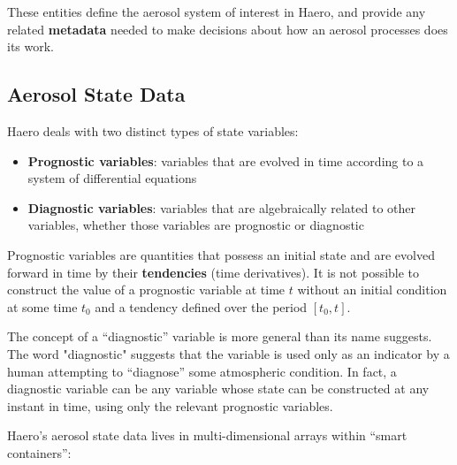 These entities define the aerosol system of interest in Haero, and provide
any related {\bf metadata} needed to make decisions about how an aerosol
processes does its work.

\subsection{Aerosol State Data}

Haero deals with two distinct types of state variables:

\begin{itemize}
  \item {\bf Prognostic variables}: variables that are evolved in time according
        to a system of differential equations
  \item {\bf Diagnostic variables}: variables that are algebraically related to
        other variables, whether those variables are prognostic or diagnostic
\end{itemize}

Prognostic variables are quantities that possess an initial state and are
evolved forward in time by their {\bf tendencies} (time derivatives). It is
not possible to construct the value of a prognostic variable at time $t$ without
an initial condition at some time $t_0$ and a tendency defined over the period
$\left[t_0, t\right]$.

The concept of a ``diagnostic'' variable is more general than its name suggests.
The word "diagnostic" suggests that the variable is used only as an indicator
by a human attempting to ``diagnose'' some atmospheric condition. In fact, a
diagnostic variable can be any variable whose state can be constructed at any
instant in time, using only the relevant prognostic variables.

Haero's aerosol state data lives in multi-dimensional arrays within ``smart
containers'':


